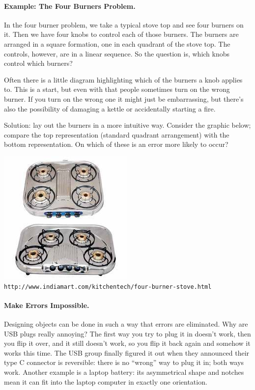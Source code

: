 \paragraph{Example: The Four Burners Problem.}
In the four burner problem, we take a typical stove top and see four burners on it. Then we have four knobs to control each of those burners. The burners are arranged in a square formation, one in each quadrant of the stove top. The controls, however, are in a linear sequence. So the question is, which knobs control which burners?

Often there is a little diagram highlighting which of the burners a knob applies to. This is a start, but even with that people sometimes turn on the wrong burner. If you turn on the wrong one it might just be embarrassing, but there's also the possibility of damaging a kettle or accidentally starting a fire. 

Solution: lay out the burners in a more intuitive way. Consider the graphic below; compare the top representation (standard quadrant arrangement) with the bottom representation. On which of these is an error more likely to occur?
\vspace{-0.5em}
\begin{center}
	\includegraphics{images/4-burner.jpg}\\ \texttt{http://www.indiamart.com/kitchentech/four-burner-stove.html}
\end{center}

\paragraph{Make Errors Impossible.}
Designing objects can be done in such a way that errors are eliminated. Why are USB plugs really annoying? The first way you try to plug it in doesn't work, then you flip it over, and it still doesn't work, so you flip it back again and somehow it works this time. The USB group finally figured it out when they announced their type C connector is reversible: there is no ``wrong'' way to plug it in; both ways work. Another example is a laptop battery: its asymmetrical shape and notches mean it can fit into the laptop computer in exactly one orientation.

